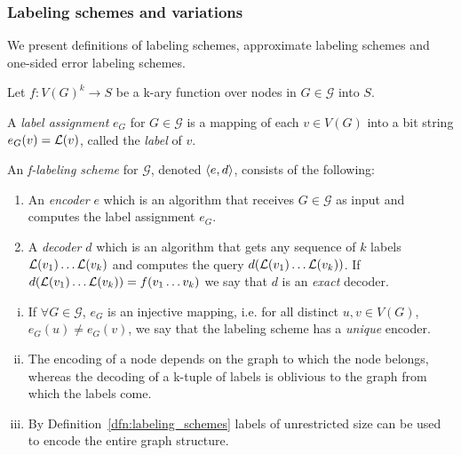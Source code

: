 \subsubsection{Labeling schemes and variations} 
We present definitions of labeling schemes, approximate labeling schemes and one-sided error labeling schemes.			
\begin{definition}\label{dfn:labeling_schemes}
Let $f : V(G)^k  \rightarrow S$ be a k-ary function  over nodes in  $G \in \mathcal{G}$ into $S$.


A \emph{label assignment} $e_G$  for $G \in \mathcal{G}$ is a mapping of each $v \in V(G)$ into a bit  string $e_G(v)=  \mathcal{L}(v)$, called  the \emph{label} of $v$.

An  \emph{f-labeling scheme} for  $\mathcal{G}$, denoted  $\left \langle e,d \right \rangle $, consists   of the  following:
	\begin{enumerate}
		\item An \emph{encoder} $e$ which is an algorithm that  receives  $G \in \mathcal{G}$ as input and  computes the label assignment $e_G$. 
		 \item A \emph{decoder}  $d$ which is an algorithm  that  gets  any sequence of $k$ labels  $ \mathcal{L}(v_1)\dots  \mathcal{L}(v_k)$  and computes the query $d( \mathcal{L}(v_1)\dots  \mathcal{L}(v_k))$.
		 If  $d( \mathcal{L}(v_1)\dots  \mathcal{L}(v_k))=f(v_1\dots v_k)$ we say that $d$ is an \emph{exact} decoder.
	\end{enumerate}
\end{definition}

\begin{remark}  \label{remark:unique}\mbox{}
		\begin{enumerate}[i.]
			\item If $\forall G \in \mathcal{G}$, $e_G$ is an injective mapping, i.e. for all distinct $u,v \in V(G)$, $e_G(u) \neq e_G(v) $, we say that the labeling scheme has a \emph{unique} encoder.
			\item The encoding of a node depends on the graph to which the node belongs, whereas the decoding of a k-tuple of labels is oblivious to the graph from which the labels come.
			\item By Definition~\ref{dfn:labeling_schemes} labels of unrestricted size can be used to encode the entire graph structure.
		
		\end{enumerate}
\end{remark}



